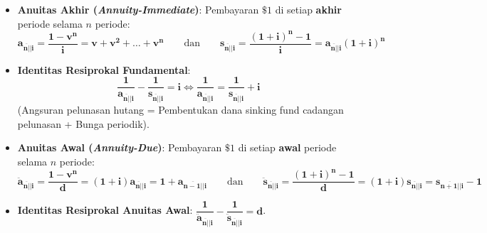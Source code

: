 \documentclass[10pt,a4paper]{article}
\newcommand{\angl}[1]{\overline{#1|}}
\begin{document}
\begin{rumusbox}
\begin{itemize}[leftmargin=1.5em, topsep=1.5pt, itemsep=2.5pt]
    \item \textbf{Anuitas Akhir (\textit{Annuity-Immediate})}: Pembayaran $\$1$ di setiap \textbf{akhir} periode selama $n$ periode:
    \begin{equation*}
        \mathbf{a_{\angl{n}|i} = \frac{1 - v^n}{i} = v + v^2 + \dots + v^n} \qquad\text{dan}\qquad \mathbf{s_{\angl{n}|i} = \frac{(1+i)^n - 1}{i} = a_{\angl{n}|i} (1+i)^n}
    \end{equation*}
    \item \textbf{Identitas Resiprokal Fundamental}:
    \begin{equation*}
        \mathbf{\frac{1}{a_{\angl{n}|i}} - \frac{1}{s_{\angl{n}|i}} = i} \iff \mathbf{\frac{1}{a_{\angl{n}|i}} = \frac{1}{s_{\angl{n}|i}} + i}
    \end{equation*}
    (Angsuran pelunasan hutang = Pembentukan dana sinking fund cadangan pelunasan + Bunga periodik).
    \item \textbf{Anuitas Awal (\textit{Annuity-Due})}: Pembayaran $\$1$ di setiap \textbf{awal} periode selama $n$ periode:
    \begin{equation*}
        \mathbf{\ddot{a}_{\angl{n}|i} = \frac{1 - v^n}{d} = (1+i) a_{\angl{n}|i} = 1 + a_{\angl{n-1}|i}} \qquad\text{dan}\qquad \mathbf{\ddot{s}_{\angl{n}|i} = \frac{(1+i)^n - 1}{d} = (1+i) s_{\angl{n}|i} = s_{\angl{n+1}|i} - 1}
    \end{equation*}
    \item \textbf{Identitas Resiprokal Anuitas Awal}: $\mathbf{\dfrac{1}{\ddot{a}_{\angl{n}|i}} - \dfrac{1}{\ddot{s}_{\angl{n}|i}} = d}$.
\end{itemize}
\end{rumusbox}
\end{document}
